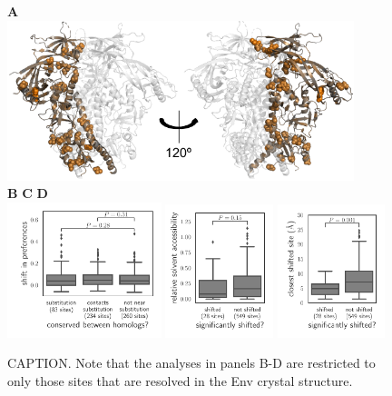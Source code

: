\documentclass[9pt]{elife}
\begin{document}
\begin{figure}
{\bf \Large A} \\
\includegraphics[width=0.9\textwidth]{figures/shifts_on_structure/shifts_on_structure.pdf}
\\
{\bf \Large B} \hspace{0.38\textwidth} {\bf \Large C} \hspace{0.28\textwidth} {\bf \Large D} \\
\includegraphics[width=0.4\textwidth]{figures/conservation_vs_shifts.pdf} 
\hspace{0.01\textwidth}
\includegraphics[width=0.28\textwidth]{figures/rsa_vs_shifts.pdf}
\hspace{0.01\textwidth}
\includegraphics[width=0.28\textwidth]{figures/shifts_proximity.pdf}
\caption{\label{fig:shiftfeatures}
CAPTION.
Note that the analyses in panels B-D are restricted to only those sites that are resolved in the Env crystal structure.
}
\end{figure}
\end{document}
